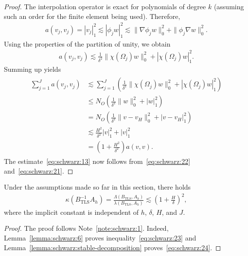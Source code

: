 \begin{proof}
  The interpolation operator is exact for polynomials of degree $k$
  (assuming such an order for the finite element being
  used). Therefore,
  \begin{gather*}
    a(v_j,v_j) = |v_j|_1^2 \lesssim |\phi_j w|_1^2
    \lesssim \|\nabla \phi_j w\|_0^2 + \|\phi_j \nabla w\|_0^2.
  \end{gather*}
  Using the properties of the partition of unity, we obtain
  \begin{gather*}
    a(v_j,v_j) \lesssim \frac1{\delta^2} \|\chi(\Omega_j) w\|_0^2 + |\chi(\Omega_j)w|_1^2.
  \end{gather*}
  Summing up yields
  \begin{gather}
    \label{eq:schwarz:21}
    \begin{split}
      \sum_{j=1}^J a(v_j, v_j)
      &\lesssim \sum_{j=1}^J \left(\frac1{\delta^2} \|\chi(\Omega_j)
        w\|_0^2 + |\chi(\Omega_j)w|_1^2\right) \\
      &\le N_O \left(\frac1{\delta^2}\|w\|_0^2 + |w|_1^2\right) \\
      &=  N_O \left(\frac1{\delta^2} \|v-v_H\|_0^2 + |v-v_H|_1^2\right)
      \\
      & \lesssim \frac{H^2}{\delta^2} |v|_1^2 + |v|_1^2 \\
      &= \left(1+\frac{H^2}{\delta^2}\right) a(v,v).      
    \end{split}
  \end{gather}
  The estimate~\eqref{eq:schwarz:13} now follows
  from~\eqref{eq:schwarz:22} and~\eqref{eq:schwarz:21}.
\end{proof}

\begin{theorem}
  \label{theorem:schwarz:two-level-convergence}
  Under the assumptions made so far in this section, there holds
  \begin{gather}
    \label{eq:schwarz:14}
    \kappa(B^{-1}_{\text{TLS}} A_h)
    = \frac{\Lambda(B_{\text{TLS}}, A_h)}{\lambda(B_{\text{TLS}},
      A_h)}
    \lesssim \left(1+\frac H\delta\right)^2,
  \end{gather}
  where the implicit constant is independent of $h$, $\delta$, $H$, and $J$.
\end{theorem}

\begin{proof}
  The proof follows Note~\ref{note:schwarz:1}. Indeed,
  Lemma~\ref{lemma:schwarz:6} proves inequality~\eqref{eq:schwarz:23}
  and Lemma~\ref{lemma:schwarz:stable-decomposition}
  proves~\eqref{eq:schwarz:24}.
\end{proof}

